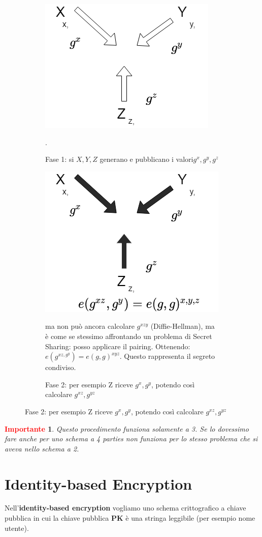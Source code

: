 \documentclass{book}
\newtheorem*{Importante}{\textbf{\textcolor{red}{Importante}}}
\begin{document}
\begin{figure}[ht]
	\begin{subfigure}[tl]{0.35\textwidth}
		\centering
		\includegraphics[scale=0.3]{joux1.png}
		\caption{Fase 1: si \(X,Y,Z\) generano e pubblicano i valori\(g^{x},g^{y},g^{z}\)}.
	\end{subfigure}
	\begin{subfigure}[l]{0.50\textwidth}
		\centering
		\includegraphics[scale=0.3]{joux2.png}
		\caption{Fase 2: per esempio Z riceve \(g^{x},g^{y}\), potendo così calcolare \(g^{xz},g^{yz}\)} ma non può ancora calcolare \(g^{xzy}\) (Diffie-Hellman), ma è come se stessimo affrontando un problema di Secret Sharing: posso applicare il pairing. Ottenendo:\(e(g^{xz,g^{y}})={e(g,g)}^{xyz}\). Questo rappresenta il segreto condiviso.
	\end{subfigure}
\end{figure}
\begin{Importante}
	Questo procedimento funziona solamente a 3. Se lo dovessimo fare anche per uno schema a 4 parties non funziona per lo stesso problema che si aveva nello schema a 2.
\end{Importante}
\section{Identity-based Encryption}
Nell'\textbf{identity-based encryption} vogliamo uno schema crittografico a chiave pubblica in cui la chiave pubblica \textbf{PK} è una stringa leggibile (per esempio nome utente).
\end{document}

